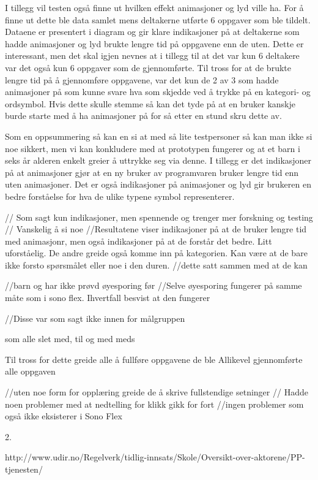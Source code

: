 I tillegg vil testen også finne ut hvilken effekt animasjoner og lyd ville ha. For å finne ut dette ble data samlet mens deltakerne utførte 6 oppgaver som ble tildelt. Dataene er presentert i diagram og gir klare indikasjoner på at deltakerne som hadde animasjoner og lyd brukte lengre tid på oppgavene enn de uten. Dette er interessant, men det skal igjen nevnes at i tillegg til at det var kun 6 deltakere var det også kun 6 oppgaver som de gjennomførte. Til tross for at de brukte lengre tid på å gjennomføre oppgavene, var det kun de 2 av 3 som hadde animasjoner på som kunne svare hva som skjedde ved å trykke på en kategori- og ordsymbol. Hvis dette skulle stemme så kan det tyde på at en bruker kanskje burde starte med å ha animasjoner på for så etter en stund skru dette av.  
 
 
Som en oppsummering så kan en si at med så lite testpersoner så kan man ikke si noe sikkert, men vi kan konkludere med at prototypen fungerer og at et barn i seks år alderen enkelt greier å uttrykke seg via denne. I tillegg er det indikasjoner på at animasjoner gjør at en ny bruker av programvaren bruker lengre tid enn uten animasjoner. Det er også indikasjoner på animasjoner og lyd gir brukeren en bedre forståelse for hva de ulike typene symbol representerer.  
 

 
 
// Som sagt kun indikasjoner, men spennende og trenger mer forskning og testing 
// Vanskelig å si noe 
//Resultatene viser indikasjoner på at de bruker lengre tid med animasjonr, men også indikasjoner på at de forstår det bedre. Litt uforståelig. De andre greide også komme inn på kategorien. Kan være at de bare ikke forsto spørsmålet eller noe i den duren. 
//dette satt sammen med at de kan 
 
 
 
 
//barn og har ikke prøvd øyesporing før 
//Selve øyesporing fungerer på samme måte som i sono flex. Ihvertfall besvist at den fungerer 
 
 
 
 
 
 
//Disse var som sagt ikke innen for målgruppen 
 
 
som alle slet med, til og med meds 
 
 
 
 
Til tross for dette greide alle å fullføre oppgavene de ble Allikevel gjennomførte alle oppgaven 
 
 
 
 
 
 
 
 
 
 
//uten noe form for opplæring greide de å skrive fullstendige setninger 
// Hadde noen problemer med at nedtelling for klikk gikk for fort 
//ingen problemer som også ikke eksisterer i Sono Flex 
 
 
 
 
2. 
 
 
 
 
 
 
 
 
 
 
 
 
http://www.udir.no/Regelverk/tidlig-innsats/Skole/Oversikt-over-aktorene/PP-tjenesten/  
 